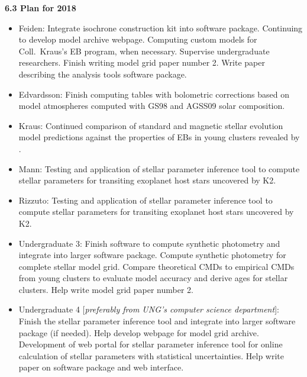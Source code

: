 {\bf 6.3 Plan for 2018} 

\begin{itemize}
	\item[] Feiden: Integrate isochrone construction kit into software package. Continuing to develop model archive webpage. Computing custom models for Coll.\ Kraus's EB program, when necessary. Supervise undergraduate researchers. Finish writing model grid paper number 2. Write paper describing the analysis tools software package. \\
	
	\item[] Edvardsson: Finish computing tables with bolometric corrections based on model atmospheres computed with GS98 and AGSS09 solar composition.  \\
	
	\item[] Kraus: Continued comparison of standard and magnetic stellar evolution model predictions against the properties of EBs in young clusters revealed by \kepler. \\
	
	\item[] Mann: Testing and application of stellar parameter inference tool to compute stellar parameters for transiting exoplanet host stars uncovered by K2. \\
	
	\item[] Rizzuto: Testing and application of stellar parameter inference tool to compute stellar parameters for transiting exoplanet host stars uncovered by K2. \\

	\item[] Undergraduate 3: Finish software to compute synthetic photometry and integrate into larger software package. Compute synthetic photometry for complete stellar model grid. Compare theoretical CMDs to empirical CMDs from young clusters to evaluate model accuracy and derive ages for stellar clusters. Help write model grid paper number 2. \\
	
	\item[] Undergraduate 4 [{\it preferably from UNG's computer science department}]: Finish the stellar parameter inference tool and integrate into larger software package (if needed). Help develop webpage for model grid archive. Development of web portal for stellar parameter inference tool for online calculation of stellar parameters with statistical uncertainties. Help write paper on software package and web interface.
\end{itemize} 
